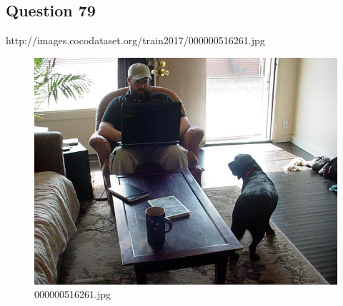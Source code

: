 \subsection*{Question 79}
http://images.cocodataset.org/train2017/000000516261.jpg
\begin{figure}[h]
    \centering
    \includegraphics[width=0.8\linewidth]{../image set/hard/000000516261.jpg}
    \caption{000000516261.jpg}
\end{figure}
